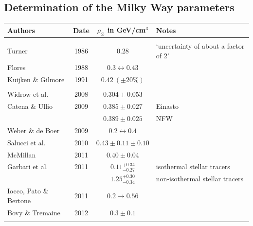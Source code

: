 \subsection[Milky Way parameters]{Determination of the Milky Way parameters}\label{sec:MilkyWay}


\renewcommand{\arraystretch}{0.7}
\begin{table}[!t]
\begin{center}
\small{
\begin{tabular}{l|c|c|l}
\bf Authors & \bf Date & \bfseries{$\rho_\odot$  in GeV/cm$^3$} & \bf  Notes \\[1mm]
\hline
& &  & \\[-3mm] \rowcolor[rgb]{0.95,0.97,0.97}
Turner 				& 1986	& 0.28 & {`uncertainty of about a factor of 2'}\\[1mm] \rowcolor[rgb]{0.95,0.97,0.97}
Flores 				& 1988	& $0.3 \leftrightarrow 0.43$ & \\[1mm] \rowcolor[rgb]{0.95,0.97,0.97}
Kuijken \& Gilmore		& 1991 	& $0.42\ (\pm 20\%)$ & \\[1mm]
\hdashline \rowcolor[rgb]{0.97,0.97,0.93}
& & &  \\[-2mm] \rowcolor[rgb]{0.97,0.97,0.93}
Widrow et al. 			& 2008 	& $0.304 \pm 0.053$ & \\[1mm] \rowcolor[rgb]{0.97,0.97,0.93}
Catena \& Ullio 			& 2009  	& $0.385 \pm 0.027$ & {Einasto} \\ \rowcolor[rgb]{0.97,0.97,0.93}
					& 		& $0.389 \pm 0.025$ & {NFW} \\[1mm] \rowcolor[rgb]{0.97,0.97,0.93}
Weber \& de Boer 		& 2009 	& $0.2 \leftrightarrow 0.4$ & \\[1mm] \rowcolor[rgb]{0.97,0.97,0.93}
Salucci et al. 			& 2010 	& $0.43\pm0.11\pm0.10$ & \\[1mm] \rowcolor[rgb]{0.97,0.97,0.93}
McMillan 				& 2011 	& $0.40 \pm 0.04$ & \\[1mm]	 \rowcolor[rgb]{0.97,0.97,0.93}
Garbari et al. 			& 2011 	& $0.11^{+0.34}_{-0.27}$ & {isothermal stellar tracers} \\[0.6mm] \rowcolor[rgb]{0.97,0.97,0.93}
					& 		& $1.25^{+0.30}_{-0.34}$ & {non-isothermal stellar tracers} \\[1mm]\rowcolor[rgb]{0.97,0.97,0.93}
Iocco, Pato \& Bertone	& 2011	& $0.2 \to 0.56$	& 	\\[1mm]	\rowcolor[rgb]{0.97,0.97,0.93}
Bovy \& Tremaine 		& 2012 	& $0.3\pm0.1$ & \\[1mm]\rowcolor[rgb]{0.97,0.97,0.93}

\end{tabular}}
\end{center}
\end{table}
